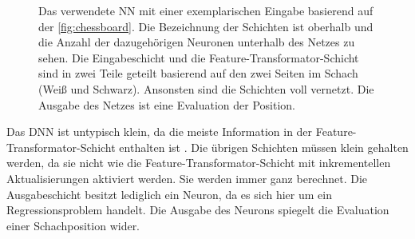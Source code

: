 \begin{figure}
{
  }%
  \caption{Das verwendete \ac{NN} mit einer exemplarischen Eingabe basierend auf der \autoref{fig:chessboard}. Die Bezeichnung der Schichten ist oberhalb und die Anzahl der dazugehörigen Neuronen unterhalb des Netzes zu sehen. Die Eingabeschicht und die Feature-Transformator-Schicht sind in zwei Teile geteilt basierend auf den zwei Seiten im Schach (Weiß und Schwarz). Ansonsten sind die Schichten voll vernetzt. Die Ausgabe des Netzes ist eine Evaluation der Position.}
  \label{fig:own-nn}
\end{figure}

Das \acl{DNN} ist untypisch klein, da die meiste Information in der Feature-Transformator-Schicht enthalten ist \cite{StockfishNNUE}. Die übrigen Schichten müssen klein gehalten werden, da sie nicht wie die Feature-Transformator-Schicht mit inkrementellen Aktualisierungen aktiviert werden. Sie werden immer ganz berechnet. Die Ausgabeschicht besitzt lediglich ein Neuron, da es sich hier um ein Regressionsproblem handelt. Die Ausgabe des Neurons spiegelt die Evaluation einer Schachposition wider.

